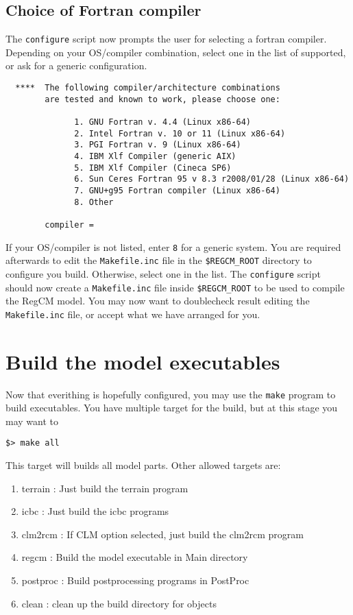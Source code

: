 \subsection{Choice of Fortran compiler}

The \verb=configure= script now prompts the user for selecting a fortran
compiler. Depending on your OS/compiler combination, select one in the list
of supported, or ask for a generic configuration.

\begin{Verbatim}
  ****  The following compiler/architecture combinations 
        are tested and known to work, please choose one:

              1. GNU Fortran v. 4.4 (Linux x86-64)
              2. Intel Fortran v. 10 or 11 (Linux x86-64)
              3. PGI Fortran v. 9 (Linux x86-64)
              4. IBM Xlf Compiler (generic AIX)
              5. IBM Xlf Compiler (Cineca SP6)
              6. Sun Ceres Fortran 95 v 8.3 r2008/01/28 (Linux x86-64)
              7. GNU+g95 Fortran compiler (Linux x86-64)
              8. Other

        compiler =
\end{Verbatim}

If your OS/compiler is not listed, enter \verb=8= for a generic system.
You are required afterwards to edit the \verb=Makefile.inc= file in the
\verb=$REGCM_ROOT= directory to configure you build.
Otherwise, select one in the list. The \verb=configure= script should now
create a \verb=Makefile.inc= file inside \verb=$REGCM_ROOT= to be used
to compile the RegCM model. You may now want to doublecheck result editing
the \verb=Makefile.inc= file, or accept what we have arranged for you.

\section{Build the model executables}

Now that everithing is hopefully configured, you may use the \verb=make=
program to build executables.
You have multiple target for the build, but at this stage you may want to

\begin{Verbatim}
$> make all
\end{Verbatim}

This target will builds all model parts. Other allowed targets are:

\begin{enumerate}
\item terrain : Just build the terrain program
\item icbc : Just build the icbc programs
\item clm2rcm : If CLM option selected, just build the clm2rcm program
\item regcm : Build the model executable in Main directory
\item postproc : Build postprocessing programs in PostProc
\item clean : clean up the build directory for objects
\end{enumerate}

